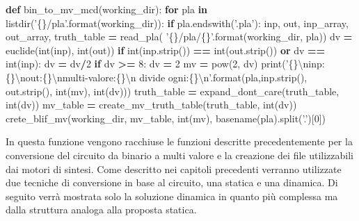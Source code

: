 \documentclass[]{book}
\newenvironment{Shaded}{\begin{snugshade}}{\end{snugshade}}
\newcommand{\BuiltInTok}[1]{#1}
\newcommand{\CharTok}[1]{\textcolor[rgb]{0.31,0.60,0.02}{#1}}
\newcommand{\ControlFlowTok}[1]{\textcolor[rgb]{0.13,0.29,0.53}{\textbf{#1}}}
\newcommand{\DecValTok}[1]{\textcolor[rgb]{0.00,0.00,0.81}{#1}}
\newcommand{\KeywordTok}[1]{\textcolor[rgb]{0.13,0.29,0.53}{\textbf{#1}}}
\newcommand{\NormalTok}[1]{#1}
\newcommand{\OperatorTok}[1]{\textcolor[rgb]{0.81,0.36,0.00}{\textbf{#1}}}
\newcommand{\SpecialCharTok}[1]{\textcolor[rgb]{0.00,0.00,0.00}{#1}}
\newcommand{\StringTok}[1]{\textcolor[rgb]{0.31,0.60,0.02}{#1}}
\begin{document}
\begin{Shaded}
\begin{Highlighting}[]
\KeywordTok{def}\NormalTok{ bin_to_mv_mcd(working_dir):}
  \ControlFlowTok{for}\NormalTok{ pla }\KeywordTok{in}\NormalTok{ listdir(}\StringTok{'}\SpecialCharTok{\{\}}\StringTok{/pla'}\NormalTok{.}\BuiltInTok{format}\NormalTok{(working_dir)):}
    \ControlFlowTok{if}\NormalTok{ pla.endswith(}\StringTok{'.pla'}\NormalTok{):}
\NormalTok{      inp, out, inp_array, out_array, truth_table }\OperatorTok{=}\NormalTok{ read_pla(}
        \StringTok{'}\SpecialCharTok{\{\}}\StringTok{/pla/}\SpecialCharTok{\{\}}\StringTok{'}\NormalTok{.}\BuiltInTok{format}\NormalTok{(working_dir, pla))}
\NormalTok{      dv }\OperatorTok{=}\NormalTok{ euclide(}\BuiltInTok{int}\NormalTok{(inp), }\BuiltInTok{int}\NormalTok{(out))}
      \ControlFlowTok{if} \BuiltInTok{int}\NormalTok{(inp.strip()) }\OperatorTok{==} \BuiltInTok{int}\NormalTok{(out.strip()) }\KeywordTok{or}\NormalTok{ dv }\OperatorTok{==} \BuiltInTok{int}\NormalTok{(inp):}
\NormalTok{        dv }\OperatorTok{=}\NormalTok{ dv}\OperatorTok{/}\DecValTok{2}
      \ControlFlowTok{if}\NormalTok{ dv }\OperatorTok{>=} \DecValTok{8}\NormalTok{:}
\NormalTok{        dv }\OperatorTok{=} \DecValTok{2} 
\NormalTok{        mv }\OperatorTok{=} \BuiltInTok{pow}\NormalTok{(}\DecValTok{2}\NormalTok{, dv)}
        \BuiltInTok{print}\NormalTok{(}\StringTok{'}\SpecialCharTok{\{\}}\CharTok{\textbackslash{}n}\StringTok{inp: }\SpecialCharTok{\{\}}\CharTok{\textbackslash{}n}\StringTok{out:}\SpecialCharTok{\{\}}\CharTok{\textbackslash{}n}\StringTok{multi-valore:}\SpecialCharTok{\{\}}\CharTok{\textbackslash{}n}
\StringTok{          divide ogni:}\SpecialCharTok{\{\}}\CharTok{\textbackslash{}n}\StringTok{'}\NormalTok{.}\BuiltInTok{format}\NormalTok{(pla,inp.strip(), }
\NormalTok{          out.strip(), }\BuiltInTok{int}\NormalTok{(mv), }\BuiltInTok{int}\NormalTok{(dv)))}
\NormalTok{        truth_table }\OperatorTok{=}\NormalTok{ expand_dont_care(truth_table, }\BuiltInTok{int}\NormalTok{(dv))}
\NormalTok{        mv_table }\OperatorTok{=}\NormalTok{ create_mv_truth_table(truth_table, }\BuiltInTok{int}\NormalTok{(dv))}
\NormalTok{        crete_blif_mv(working_dir, mv_table, }\BuiltInTok{int}\NormalTok{(mv),}
\NormalTok{          basename(pla).split(}\StringTok{'.'}\NormalTok{)[}\DecValTok{0}\NormalTok{])}
\end{Highlighting}
\end{Shaded}

In questa funzione vengono racchiuse le funzioni descritte precedentemente per la conversione del circuito da binario a multi valore e la creazione dei file utilizzabili dai motori di sintesi. Come descritto nei capitoli precedenti verranno utilizzate due tecniche di conversione in base al circuito, una statica e una dinamica. Di seguito verrà mostrata solo la soluzione dinamica in quanto più complessa ma dalla struttura analoga alla proposta statica.
\end{document}
